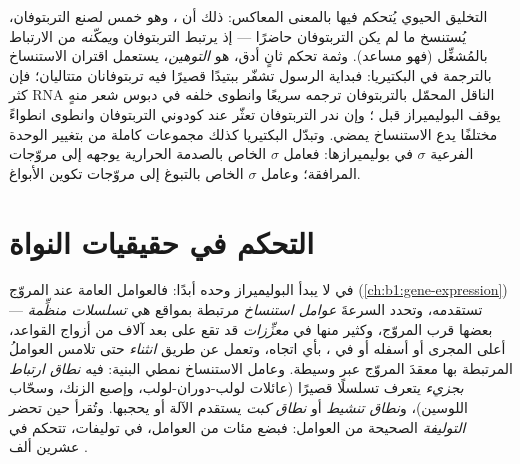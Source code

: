\begin{proposition}\label{prop:b1:expression-control:trp}
 التخليق الحيوي يُتحكم فيها بالمعنى المعاكس: ذلك
أن \emph{}، وهو خمس  لصنع التربتوفان،
يُستنسخ ما لم يكن التربتوفان حاضرًا --- إذ يرتبط 
 التربتوفان و\emph{يمكّنه} من الارتباط بالمُشغِّل (فهو 
مساعد). وثمة تحكم ثانٍ أدق، هو \emph{التوهين}، يستعمل اقتران
الاستنساخ بالترجمة في البكتيريا: فبداية الرسول تشفّر ببتيدًا قصيرًا
فيه تربتوفانان متتاليان؛ فإن كثر RNA الناقل المحمّل بالتربتوفان
ترجمه  سريعًا وانطوى  خلفه في دبوس شعر منهٍ يوقف
البوليميراز قبل ؛ وإن ندر التربتوفان تعثّر  عند
كودوني التربتوفان وانطوى  انطواءً مختلفًا يدع الاستنساخ يمضي.
وتبدّل البكتيريا كذلك مجموعات كاملة من  بتغيير الوحدة
الفرعية $\sigma$ في بوليميرازها: فعامل $\sigma$ الخاص بالصدمة
الحرارية يوجهه إلى مروّجات   المرافقة؛ وعامل $\sigma$ الخاص
بالتبوغ إلى مروّجات تكوين الأبواغ.
\end{proposition}

\section{التحكم في حقيقيات النواة}

\begin{definition}\label{def:b1:expression-control:enhancer}
في  لا يبدأ البوليميراز وحده أبدًا: فالعوامل العامة
عند المروّج (\cref{ch:b1:gene-expression}) تستقدمه، وتحدد السرعةَ
\emph{عوامل استنساخ} مرتبطة بمواقع هي \emph{تسلسلات منظِّمة} --- بعضها قرب
المروّج، وكثير منها في \emph{معزِّزات} قد تقع على بعد آلاف من أزواج
القواعد، أعلى المجرى أو أسفله أو في ، بأي اتجاه، وتعمل
عن طريق \emph{انثناء}  حتى تلامس العواملُ المرتبطة بها معقدَ المروّج
عبر  وسيطة. وعامل الاستنساخ نمطي البنية: فيه \emph{نطاق
ارتباط بجزيء } يتعرف تسلسلًا قصيرًا (عائلات لولب-دوران-لولب، وإصبع
الزنك، وسحّاب اللوسين)، و\emph{نطاق تنشيط} أو \emph{نطاق كبت}
يستقدم الآلة أو يحجبها. وتُقرأ  حين تحضر \emph{التوليفة}
الصحيحة من العوامل: فبضع مئات من العوامل، في توليفات، تتحكم في
عشرين ألف .
\end{definition}

